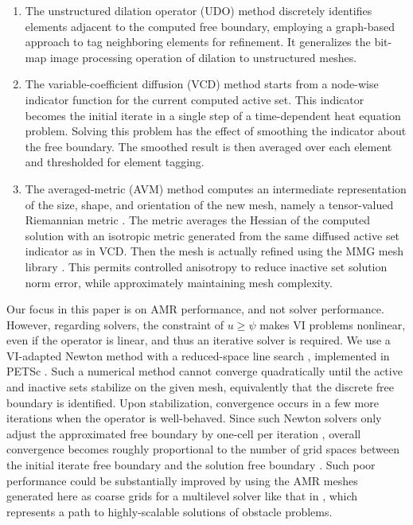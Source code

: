 \documentclass[]{interact}
\theoremstyle{plain}%
\theoremstyle{definition}
\theoremstyle{remark}
\begin{document}
\renewcommand{\labelenumi}{(\roman{enumi})}
\begin{enumerate}
\item The unstructured dilation operator (UDO) method discretely identifies elements adjacent to the computed free boundary, employing a graph-based approach to tag neighboring elements for refinement.  It generalizes the bit-map image processing operation of dilation \cite{Pratt1991} to unstructured meshes.
\item The variable-coefficient diffusion (VCD) method starts from a node-wise indicator function for the current computed active set.  This indicator becomes the initial iterate in a single step of a time-dependent heat equation problem.  Solving this problem has the effect of smoothing the indicator about the free boundary.  The smoothed result is then averaged over each element and thresholded for element tagging.
\item The averaged-metric (AVM) method computes an intermediate representation of the size, shape, and orientation of the new mesh, namely a tensor-valued Riemannian metric \cite{Alauzet2010}.  The metric averages the Hessian of the computed solution with an isotropic metric generated from the same diffused active set indicator as in VCD.  Then the mesh is actually refined using the MMG mesh library \cite{DapognyDobrzynskiFrey2014}.  This permits controlled anisotropy \cite{Wallworketal2020} to reduce inactive set solution norm error, while approximately maintaining mesh complexity.
\end{enumerate}

Our focus in this paper is on AMR performance, and not solver performance.  However, regarding solvers, the constraint of $u \geq \psi$ makes VI problems nonlinear, even if the operator is linear, and thus an iterative solver is required.  We use a VI-adapted Newton method with a reduced-space line search \cite{BensonMunson2006}, implemented in PETSc \cite{petsc-user-ref}.  Such a numerical method cannot converge quadratically until the active and inactive sets stabilize on the given mesh, equivalently that the discrete free boundary is identified.  Upon stabilization, convergence occurs in a few more iterations when the operator is well-behaved.  Since such Newton solvers only adjust the approximated free boundary by one-cell per iteration \citep{GraeserKornhuber2009}, overall convergence becomes roughly proportional to the number of grid spaces between the initial iterate free boundary and the solution free boundary \citep{Bueler2021}.  Such poor performance could be substantially improved by using the AMR meshes generated here as coarse grids for a multilevel solver like that in \cite{BuelerFarrell2024}, which represents a path to highly-scalable solutions of obstacle problems.
\end{document}
